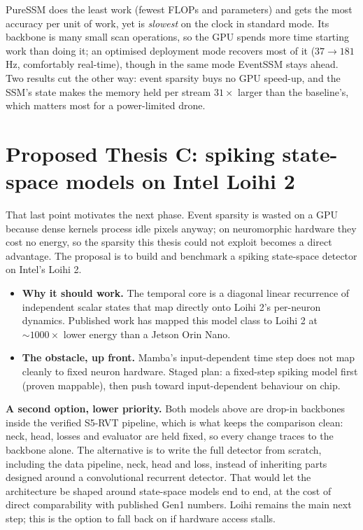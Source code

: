 \documentclass[10pt,a4paper]{article}
\begin{document}
PureSSM does the least work (fewest FLOPs and parameters) and gets the most accuracy per unit
of work, yet is \emph{slowest} on the clock in standard mode. Its backbone is many small scan operations, so
the GPU spends more time starting work than doing it; an optimised deployment mode recovers most of it
($37 \rightarrow 181$\,Hz, comfortably real-time), though in the same mode EventSSM stays ahead. Two results
cut the other way: event sparsity buys no GPU speed-up, and the SSM's state makes the memory held per
stream $31\times$ larger than the baseline's, which matters most for a power-limited drone.

\section{Proposed Thesis C: spiking state-space models on Intel Loihi 2}

That last point motivates the next phase. Event sparsity is wasted on a GPU because dense kernels process idle
pixels anyway; on neuromorphic hardware they cost no energy, so the sparsity this thesis could not exploit
becomes a direct advantage. The proposal is to build and benchmark a spiking state-space detector on
Intel's Loihi 2.

\begin{itemize}[leftmargin=1.3em, itemsep=0pt, topsep=1pt]
  \item \textbf{Why it should work.} The temporal core is a diagonal linear recurrence of independent scalar
  states that map directly onto Loihi 2's per-neuron dynamics. Published work has mapped this model class to
  Loihi 2 at ${\sim}1000\times$ lower energy than a Jetson Orin Nano.
  \item \textbf{The obstacle, up front.} Mamba's input-dependent time step does not map cleanly to fixed
  neuron hardware. Staged plan: a fixed-step spiking model first (proven mappable), then push toward
  input-dependent behaviour on chip.
\end{itemize}

\textbf{A second option, lower priority.} Both models above are drop-in backbones inside the verified S5-RVT
pipeline, which is what keeps the comparison clean: neck, head, losses and evaluator are held fixed, so every
change traces to the backbone alone. The alternative is to write the full detector from scratch, including
the data pipeline, neck, head and loss, instead of inheriting parts designed around a convolutional recurrent
detector. That would let the architecture be shaped around state-space models end to end, at the cost of
direct comparability with published Gen1 numbers. Loihi remains the main
next step; this is the option to fall back on if hardware access stalls.
\end{document}
